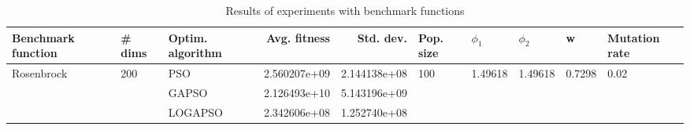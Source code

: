 \begin{table}
\centering
\caption{Results of experiments with benchmark functions}
\begin{tabular}{lllrrlllll}
\toprule
         Benchmark function &              \# dims & Optim. algorithm &  Avg. fitness &    Std. dev. &            Pop. size &               $\phi_{1}$ &               $\phi_{2}$ &                       w &         Mutation rate \\
\midrule
\multirow{3}{*}{Rosenbrock} & \multirow{3}{*}{200} &              PSO &  2.560207e+09 & 2.144138e+08 & \multirow{3}{*}{100} & \multirow{3}{*}{1.49618} & \multirow{3}{*}{1.49618} & \multirow{3}{*}{0.7298} & \multirow{3}{*}{0.02} \\
                            &                      &            GAPSO &  2.126493e+10 & 5.143196e+09 &                      &                          &                          &                         &                       \\
                            &                      &          LOGAPSO &  2.342606e+08 & 1.252740e+08 &                      &                          &                          &                         &                       \\
\bottomrule
\end{tabular}
\end{table}
